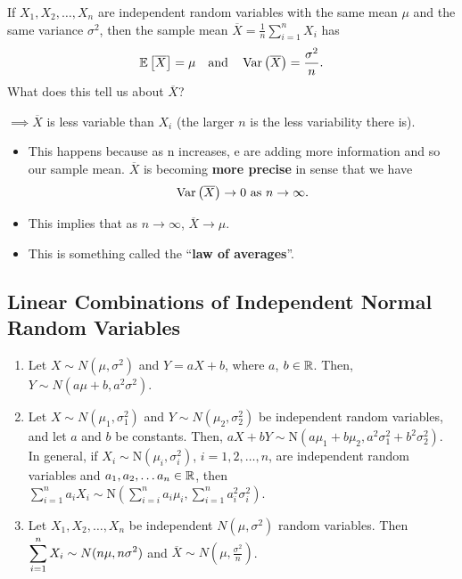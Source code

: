 \begin{remark}
    If $X_1,X_2,\ldots ,X_n$ are independent random variables with the same mean $\mu$ and the same variance $\sigma^2$, then the sample mean $\overline{X} = \frac{1}{n}\displaystyle \sum_{i=1}^{n} X_i$ has \vspace{-3mm}
    \[
        \mathbb{E}\left[{\overline{X}}\right] = \mu \quad \text{and} \quad \operatorname{Var}\left({\overline{X}}\right) = \frac{\sigma^2}{n}.
    \]
    What does this tell us about $\overline{X}$? 
    
    $\implies \overline{X}$ is less variable than $X_i$ (the larger $n$ is the less variability there is).
    \begin{itemize}
        \item This happens because as n increases, e are adding more
        information and so our sample mean. $\overline{X}$ is becoming \textbf{more precise} in sense that we have \vspace{-3mm}
        \[
            \operatorname{Var}\left({\overline{X}}\right) \to 0 \text{ as } n \to \infty.
        \]
        \item This implies that as $n\to \infty$, $\overline{X} \to \mu$.
        \item This is something called the ``\textbf{law of averages}''.
    \end{itemize}
\end{remark}

\pagebreak


\subsection{Linear Combinations of Independent Normal Random Variables}

\begin{theorem}
    \phantom{}
    \begin{enumerate}
        \item Let $X \sim N(\mu, \sigma^2)$ and $Y = aX + b$, where $a$, $b \in {\mathbb{R}}$.
        Then, $Y \sim N(a\mu + b, a^2\sigma^2)$.
        \item Let $X \sim N(\mu_1, \sigma_1^2)$ and $Y \sim N(\mu_2, \sigma_2^2)$ be independent random variables, and let $a$ and $b$ be constants.
        Then, $aX+bY \sim \text{N}(a\mu_1 + b\mu_2, a^2\sigma_1^2 + b^2\sigma_2^2)$. \\
        In general, if $X_i \sim \text{N}(\mu_i, \sigma_i^2)$, $i=1,2,\ldots,n$, are independent random variables and $a_1,a_2,\ldots a_n \in {\mathbb{R}}$, then $\displaystyle \sum_{i=1}^{n} a_iX_i \sim \text{N}\left( \displaystyle \sum_{i=i}^{n} a_i\mu_i, \displaystyle \sum_{i=1}^{n} a_i^2 \sigma_i^2 \right)$.
        \item Let $X_1, X_2, \ldots, X_n$ be independent $N(\mu, \sigma^2)$ random variables. Then
        $\displaystyle \sum_{i=1}^{n} X_i \sim N(n\mu, n\sigma^2)$ and $\overline{X} \sim N(\mu, \frac{\sigma^2}{n})$.
    \end{enumerate}
\end{theorem}

